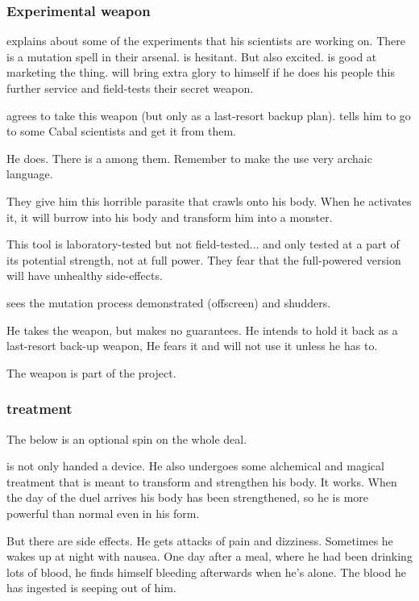 \begin{garbage}
\subsubsection{Experimental weapon}
\Azraid{} explains about some of the experiments that his scientists are working on. 
There is a mutation spell in their arsenal. 
\Teshrial{} is hesitant. 
But also excited.
\Azraid{} is good at marketing the thing. 
\Teshrial{} will bring extra glory to himself if he does his people this further service and field-tests their secret weapon. 

\Teshrial{} agrees to take this weapon (but only as a last-resort backup plan). 
\Azraid{} tells him to go to some Cabal scientists and get it from them. 

He does. 
There is a \banelord{} among them. 
Remember to make the \banelord{} use very archaic language. 

They give him this horrible parasite that crawls onto his body. 
When he activates it, it will burrow into his body and transform him into a monster. 

This tool is laboratory-tested but not field-tested... and only tested at a part of its potential strength, not at full power. 
They fear that the full-powered version will have unhealthy side-effects. 

\Teshrial{} sees the mutation process demonstrated (offscreen) and shudders. 

He takes the weapon, but makes no guarantees. 
He intends to hold it back as a last-resort back-up weapon, 
He fears it and will not use it unless he has to. 

The weapon is part of the \hs{\neoresphan} project. 





\subsubsection{\NeoResphan{} treatment}
The below is an optional spin on the whole  deal. 

\Teshrial{} is not only handed a device. 
He also undergoes some alchemical and magical treatment that is meant to transform and strengthen his body. 
It works. 
When the day of the duel arrives his body has been strengthened, so he is more powerful than normal even in his \resphan{} form. 

But there are side effects. 
He gets attacks of pain and dizziness. 
Sometimes he wakes up at night with nausea. 
One day after a meal, where he had been drinking lots of blood, he finds himself bleeding afterwards when he's alone. 
The blood he has ingested is seeping out of him. 


\end{garbage}
